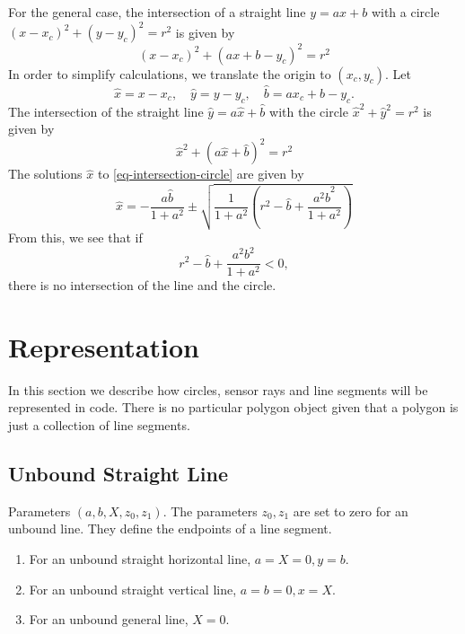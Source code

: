 \documentclass[11pt]{article}
\newcommand{\bhat}{{\hat{b}}}
\newcommand{\xhat}{{\hat{x}}}
\newcommand{\yhat}{{\hat{y}}}
\begin{document}
For the general case, the intersection of a 
straight line $y=ax+b$ with a circle $(x-x_c)^2+(y-y_c)^2=r^2$ is given by
\begin{equation}
    (x-x_c)^2 + (ax+b - y_c)^2 = r^2 
\end{equation}
In order to simplify calculations, we translate the origin to $(x_c, y_c)$. Let
\begin{equation}
    \xhat = x-x_c,\quad \yhat = y-y_c,\quad \bhat = ax_c + b - y_c.
\end{equation}
The intersection of the straight line $\yhat = a\xhat + \bhat$ with the circle
$\xhat^2 + \yhat^2 = r^2$ is given by
\begin{equation}
    \xhat^2 + (a\xhat + \bhat)^2 = r^2 \label{eq-intersection-circle}
\end{equation}
The solutions $\xhat$ to \eqref{eq-intersection-circle} are given by
\begin{equation}
    \xhat = -\frac{a\bhat}{1+a^2}\pm 
        \sqrt{\frac{1}{1+a^2}\left(r^2-\bhat+\frac{a^2 \bhat^2}{1+a^2}\right)}
\end{equation}
From this, we see that if 
\begin{equation}
    r^2-\bhat+\frac{a^2 b^2}{1+a^2} < 0, 
\end{equation}
there is no intersection of the line and the circle.

\section{Representation}
\label{sec-representation}
In this section we describe how circles, sensor rays and line segments will be
represented in code. There is no particular polygon object given that a
polygon is just a collection of line segments.

\subsection*{Unbound Straight Line}

Parameters $(a, b, X, z_0, z_1)$. 
The parameters $z_0, z_1$ are set to zero for an unbound line. They define
the endpoints of a line segment.

\begin{enumerate}
    \item For an unbound straight horizontal line, $a=X=0, y=b$.
    \item For an unbound straight vertical line, $a=b=0, x=X$.
    \item For an unbound general line, $X=0$.
\end{enumerate}
\end{document}
